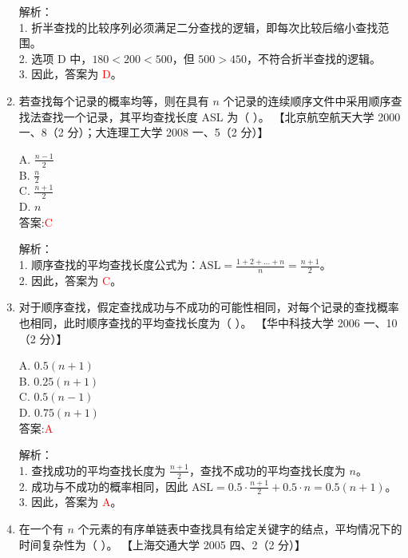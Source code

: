 \documentclass[lang=cn,newtx,10pt,scheme=chinese]{../../../elegantbook}
\begin{document}
\begin{enumerate}
    解析：\\
    1. 折半查找的比较序列必须满足二分查找的逻辑，即每次比较后缩小查找范围。\\
    2. 选项 D 中，$180 < 200 < 500$，但 $500 > 450$，不符合折半查找的逻辑。\\
    3. 因此，答案为 \textcolor{red}{D}。\\

\item 若查找每个记录的概率均等，则在具有 $n$ 个记录的连续顺序文件中采用顺序查找法查找一个记录，其平均查找长度 ASL 为（ ）。  
    【北京航空航天大学 2000 一、8（2 分）；大连理工大学 2008 一、5（2 分）】  

    A. $\frac{n-1}{2}$ \\  
    B. $\frac{n}{2}$ \\  
    C. $\frac{n+1}{2}$ \\  
    D. $n$ \\  

    答案:\textcolor{red}{C}

    解析：\\
    1. 顺序查找的平均查找长度公式为：$\text{ASL} = \frac{1 + 2 + \dots + n}{n} = \frac{n+1}{2}$。\\
    2. 因此，答案为 \textcolor{red}{C}。\\

\item 对于顺序查找，假定查找成功与不成功的可能性相同，对每个记录的查找概率也相同，此时顺序查找的平均查找长度为（ ）。  
    【华中科技大学 2006 一、10（2 分）】  

    A. $0.5(n+1)$ \\  
    B. $0.25(n+1)$ \\  
    C. $0.5(n-1)$ \\  
    D. $0.75(n+1)$ \\  

    答案:\textcolor{red}{A}

    解析：\\
    1. 查找成功的平均查找长度为 $\frac{n+1}{2}$，查找不成功的平均查找长度为 $n$。\\
    2. 成功与不成功的概率相同，因此 $\text{ASL} = 0.5 \cdot \frac{n+1}{2} + 0.5 \cdot n = 0.5(n+1)$。\\
    3. 因此，答案为 \textcolor{red}{A}。\\

\item 在一个有 $n$ 个元素的有序单链表中查找具有给定关键字的结点，平均情况下的时间复杂性为（ ）。  
    【上海交通大学 2005 四、2（2 分）】  


\end{enumerate}
\end{document}
